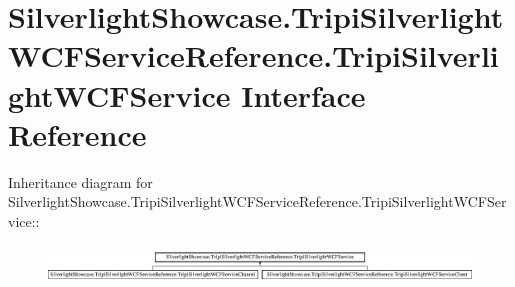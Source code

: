 \hypertarget{interface_silverlight_showcase_1_1_tripi_silverlight_w_c_f_service_reference_1_1_tripi_silverlight_w_c_f_service}{
\section{SilverlightShowcase.TripiSilverlightWCFServiceReference.TripiSilverlightWCFService Interface Reference}
\label{interface_silverlight_showcase_1_1_tripi_silverlight_w_c_f_service_reference_1_1_tripi_silverlight_w_c_f_service}
}
Inheritance diagram for SilverlightShowcase.TripiSilverlightWCFServiceReference.TripiSilverlightWCFService::\begin{figure}[H]
\begin{center}
\leavevmode
\includegraphics[height=1.01083cm]{interface_silverlight_showcase_1_1_tripi_silverlight_w_c_f_service_reference_1_1_tripi_silverlight_w_c_f_service}
\end{center}
\end{figure}
